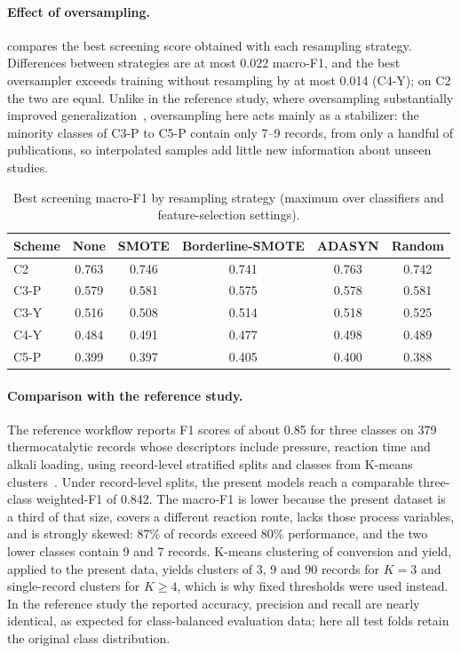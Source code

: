 \documentclass[10pt,a4paper]{article}
\newcommand{\RecCthreePW}{0.842}
\begin{document}
\paragraph{Effect of oversampling.}  compares the best
screening score obtained with each resampling strategy. Differences between
strategies are at most 0.022 macro-F1, and the best oversampler exceeds
training without resampling by at most 0.014 (C4-Y); on C2 the two are equal.
Unlike in the reference study, where oversampling substantially improved
generalization~\cite{li2025hmf}, oversampling here acts mainly as a
stabilizer: the minority classes of C3-P to C5-P contain only 7--9 records,
from only a handful of publications, so interpolated samples add little new
information about unseen studies.

\begin{table}[t]
\centering
\caption{Best screening macro-F1 by resampling strategy (maximum over
classifiers and feature-selection settings).}
\label{tab:sampling}
\small
\begin{tabular}{lccccc}
\toprule
Scheme & None & SMOTE & Borderline-SMOTE & ADASYN & Random \\
\midrule
C2   & 0.763 & 0.746 & 0.741 & 0.763 & 0.742 \\
C3-P & 0.579 & 0.581 & 0.575 & 0.578 & 0.581 \\
C3-Y & 0.516 & 0.508 & 0.514 & 0.518 & 0.525 \\
C4-Y & 0.484 & 0.491 & 0.477 & 0.498 & 0.489 \\
C5-P & 0.399 & 0.397 & 0.405 & 0.400 & 0.388 \\
\bottomrule
\end{tabular}
\end{table}

\paragraph{Comparison with the reference study.} The reference workflow reports
F1 scores of about 0.85 for three classes on 379 thermocatalytic records whose
descriptors include pressure, reaction time and alkali loading, using
record-level stratified splits and classes from K-means
clusters~\cite{li2025hmf}. Under record-level splits, the present models reach
a comparable three-class weighted-F1 of \RecCthreePW{}. The macro-F1 is lower
because the present dataset is a third of that size, covers a different
reaction route, lacks those process variables, and is strongly skewed: 87\% of
records exceed 80\% performance, and the two lower classes contain 9 and 7
records. K-means clustering of conversion and yield, applied to the present
data, yields clusters of 3, 9 and 90 records for $K = 3$ and single-record
clusters for $K \geq 4$, which is why fixed thresholds were used instead. In
the reference study the reported accuracy, precision and recall are nearly
identical, as expected for class-balanced evaluation data; here all test
folds retain the original class distribution.
\end{document}
